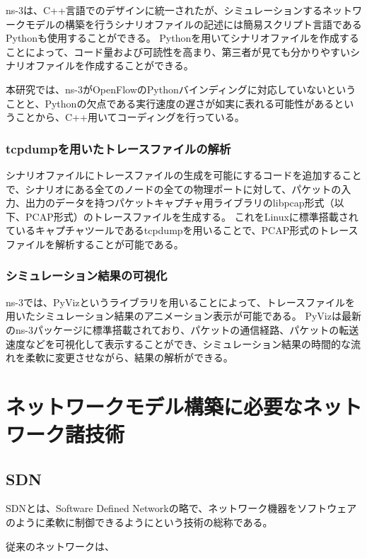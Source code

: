 ns-3は、C++言語でのデザインに統一されたが、シミュレーションするネットワークモデルの構築を行うシナリオファイルの記述には簡易スクリプト言語であるPythonも使用することができる。
Pythonを用いてシナリオファイルを作成することによって、コード量および可読性を高まり、第三者が見ても分かりやすいシナリオファイルを作成することができる。

本研究では、ns-3がOpenFlowのPythonバインディングに対応していないということと、Pythonの欠点である実行速度の遅さが如実に表れる可能性があるということから、C++用いてコーディングを行っている。

\subsubsection{tcpdumpを用いたトレースファイルの解析}

シナリオファイルにトレースファイルの生成を可能にするコードを追加することで、シナリオにある全てのノードの全ての物理ポートに対して、パケットの入力、出力のデータを持つパケットキャプチャ用ライブラリのlibpcap形式（以下、PCAP形式）のトレースファイルを生成する。
これをLinuxに標準搭載されているキャプチャツールであるtcpdumpを用いることで、PCAP形式のトレースファイルを解析することが可能である。

\subsubsection{シミュレーション結果の可視化}

ns-3では、PyVizというライブラリを用いることによって、トレースファイルを用いたシミュレーション結果のアニメーション表示が可能である。
PyVizは最新のns-3パッケージに標準搭載されており、パケットの通信経路、パケットの転送速度などを可視化して表示することができ、シミュレーション結果の時間的な流れを柔軟に変更させながら、結果の解析ができる。

\section{ネットワークモデル構築に必要なネットワーク諸技術}

\subsection{SDN}

SDNとは、Software Defined Networkの略で、ネットワーク機器をソフトウェアのように柔軟に制御できるようにという技術の総称である。\cite{SDN}

従来のネットワークは、